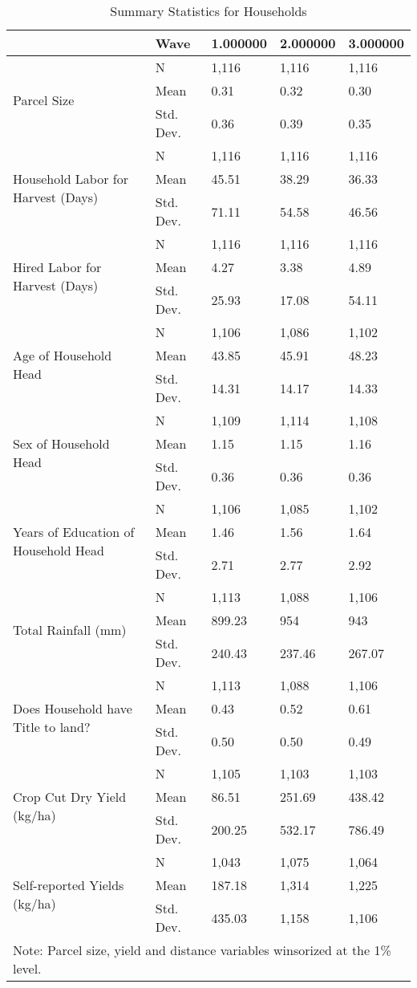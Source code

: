 \begin{table}
\caption{Summary Statistics for Households}
\label{tbl:summary}
\begin{tabular}{lllll}
\toprule
 & Wave & 1.000000 & 2.000000 & 3.000000 \\
\midrule
\multirow[c]{3}{*}{Parcel Size} & N & 1,116 & 1,116 & 1,116 \\
 & Mean & 0.31 & 0.32 & 0.30 \\
 & Std. Dev. & 0.36 & 0.39 & 0.35 \\
\multirow[c]{3}{*}{Household Labor for Harvest (Days)} & N & 1,116 & 1,116 & 1,116 \\
 & Mean & 45.51 & 38.29 & 36.33 \\
 & Std. Dev. & 71.11 & 54.58 & 46.56 \\
\multirow[c]{3}{*}{Hired Labor for Harvest (Days)} & N & 1,116 & 1,116 & 1,116 \\
 & Mean & 4.27 & 3.38 & 4.89 \\
 & Std. Dev. & 25.93 & 17.08 & 54.11 \\
\multirow[c]{3}{*}{Age of Household Head} & N & 1,106 & 1,086 & 1,102 \\
 & Mean & 43.85 & 45.91 & 48.23 \\
 & Std. Dev. & 14.31 & 14.17 & 14.33 \\
\multirow[c]{3}{*}{Sex of Household Head} & N & 1,109 & 1,114 & 1,108 \\
 & Mean & 1.15 & 1.15 & 1.16 \\
 & Std. Dev. & 0.36 & 0.36 & 0.36 \\
\multirow[c]{3}{*}{Years of Education of Household Head} & N & 1,106 & 1,085 & 1,102 \\
 & Mean & 1.46 & 1.56 & 1.64 \\
 & Std. Dev. & 2.71 & 2.77 & 2.92 \\
\multirow[c]{3}{*}{Total Rainfall (mm)} & N & 1,113 & 1,088 & 1,106 \\
 & Mean & 899.23 & 954 & 943 \\
 & Std. Dev. & 240.43 & 237.46 & 267.07 \\
\multirow[c]{3}{*}{Does Household have Title to land?} & N & 1,113 & 1,088 & 1,106 \\
 & Mean & 0.43 & 0.52 & 0.61 \\
 & Std. Dev. & 0.50 & 0.50 & 0.49 \\
\multirow[c]{3}{*}{Crop Cut Dry Yield (kg/ha)} & N & 1,105 & 1,103 & 1,103 \\
 & Mean & 86.51 & 251.69 & 438.42 \\
 & Std. Dev. & 200.25 & 532.17 & 786.49 \\
\multirow[c]{3}{*}{Self-reported Yields (kg/ha)} & N & 1,043 & 1,075 & 1,064 \\
 & Mean & 187.18 & 1,314 & 1,225 \\
 & Std. Dev. & 435.03 & 1,158 & 1,106 \\
\bottomrule
\multicolumn{6}{l}{Note: Parcel size, yield and distance variables winsorized at the 1\% level.}
\end{tabular}
\end{table}
